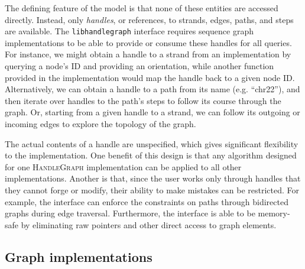 \documentclass{bioinfo}
\begin{document}
\begin{methods}
The defining feature of the model is that none of these entities are accessed directly.
Instead, only \emph{handles}, or references, to strands, edges, paths, and steps are available.
The \texttt{libhandlegraph} interface requires sequence graph implementations to be able to provide or consume these handles for all queries.
For instance, we might obtain a handle to a strand from an implementation by querying a node's ID and providing an orientation, while another function provided in the implementation would map the handle back to a given node ID.
Alternatively, we can obtain a handle to a path from its name (e.g. ``chr22''), and then iterate over handles to the path's steps to follow its course through the graph.
Or, starting from a given handle to a strand, we can follow its outgoing or incoming edges to explore the topology of the graph.


The actual contents of a handle are unspecified, which gives significant flexibility to the implementation.
One benefit of this design is that any algorithm designed for one \textsc{HandleGraph} implementation can be applied to all other implementations.
Another is that, since the user works only through handles that they cannot forge or modify, their ability to make mistakes can be restricted.
For example, the interface can enforce the constraints on paths through bidirected graphs during edge traversal.
Furthermore, the interface is able to be memory-safe by eliminating raw pointers and other direct access to graph elements.



\subsection{Graph implementations}


\end{methods}
\end{document}

